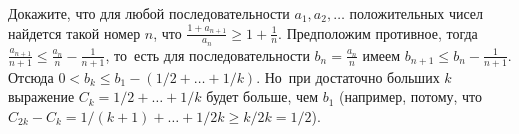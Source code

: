 \problem{}
Докажите, что для любой последовательности $a_1, a_2, \ldots$ положительных
чисел найдется такой номер $n$, что
$\frac{1 + a_{n+1}}{a_n} \geq 1 + \frac{1}{n}$.
\solution
Предположим противное, тогда
$\frac{a_{n+1}}{n + 1} \leq \frac{a_n}{n} - \frac{1}{n + 1}$,
то~есть для последовательности $b_n = \frac{a_n}{n}$ имеем
$b_{n+1} \leq b_n - \frac{1}{n + 1}$.
Отсюда $0 < b_k \leq b_1 - (1 / 2 + \ldots + 1 / k)$.
Но~при достаточно больших $k$ выражение $C_k = 1 / 2 + \ldots + 1 / k$ будет
больше, чем $b_1$ (например, потому, что
$C_{2k} - C_k = 1 / (k + 1) + \ldots + 1 / 2 k \geq k / 2 k = 1 / 2$).
\endproblem
